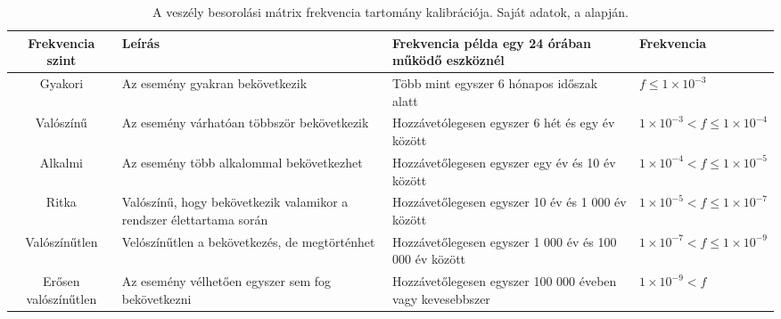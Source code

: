 \begin{table}
    \footnotesize
    \centering
    \begin{tabular}{ |c|p{10em}|p{8em}|p{10em}| }
        \hline
        Frekvencia szint & Leírás & Frekvencia példa egy 24 órában működő eszköznél & Frekvencia \\
        \hline
        Gyakori & Az esemény gyakran bekövetkezik & Több mint egyszer 6 hónapos időszak alatt & $f \leq 1\times10^{-3}$ \\
        \hline
        Valószínű & Az esemény várhatóan többször bekövetkezik & Hozzávetólegesen egyszer 6 hét és egy év között & $ 1\times10^{-3} < f \leq 1\times10^{-4} $ \\
        \hline
        Alkalmi&Az esemény több alkalommal bekövetkezhet & Hozzávetőlegesen egyszer egy év és 10 év között & $1\times10^{-4} < f \leq 1\times10^{-5}$ \\
        \hline
        Ritka&Valószínű, hogy bekövetkezik valamikor a rendszer élettartama során & Hozzávetőlegesen egyszer 10 év és 1 000 év között & $1\times10^{-5} < f \leq 1\times10^{-7}$ \\
        \hline
        Valószínűtlen&Velószínűtlen a bekövetkezés, de megtörténhet & Hozzávetőlegesen egyszer 1 000 év és 100 000 év között & $1\times10^{-7} < f \leq 1\times10^{-9}$ \\
        \hline
        Erősen valószínűtlen&Az esemény vélhetően egyszer sem fog bekövetkezni & Hozzávetőlegesen egyszer 100 000 éveben vagy kevesebbszer & $1\times10^{-9} < f$ \\
        \hline
    \end{tabular}
    \caption{A veszély besorolási mátrix frekvencia tartomány kalibrációja. Saját adatok, a \cite{EN50126-1} alapján.}
    \label{tab:freqency}
\end{table}


